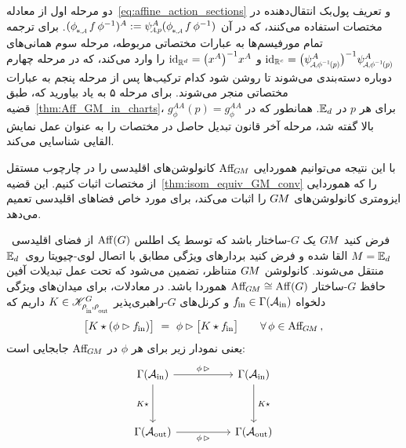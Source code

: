 دو مرحله اول از معادله~\eqref{eq:affine_action_sections} و تعریف پول‌بک انتقال‌دهنده در مختصات استفاده می‌کنند، که در آن $(\dphiA f\, \phi^{-1})^A := \psiAp^A(\dphiA f\, \phi^{-1})$.
برای ترجمه تمام مورفیسم‌ها به عبارات مختصاتی مربوطه، مرحله سوم همانی‌های $\id_{\R^c} = \big( \psiAphiinvp^A \big)^{-1} \psiAphiinvp^A$ و $\mathrm{id}_{\mathbb{R}^d} = \big( x^A \big)^{-1} x^A$ را وارد می‌کند، که در مرحله چهارم دوباره دسته‌بندی می‌شوند تا روشن شود کدام ترکیب‌ها پس از مرحله پنجم به عبارات مختصاتی منجر می‌شوند.
برای مرحله ۵ به یاد بیاورید که، طبق قضیه~\ref{thm:Aff_GM_in_charts}، $g_\phi^{AA}(p) = g_\phi^{AA}$ برای هر $p$ در $\mathbb{E}_d$.
همانطور که در بالا گفته شد، مرحله آخر قانون تبدیل حاصل در مختصات را به عنوان عمل نمایش القایی شناسایی می‌کند.

با این نتیجه می‌توانیم هموردایی $\operatorname{Aff}_{\mkern-2muG\mkern-1.4muM}$ کانولوشن‌های اقلیدسی را در چارچوب مستقل از مختصات اثبات کنیم.
این قضیه~\ref{thm:isom_equiv_GM_conv} را که هموردایی ایزومتری کانولوشن‌های $G\mkern-1.4muM$ را اثبات می‌کند، برای مورد خاص فضاهای اقلیدسی تعمیم می‌دهد.
\begin{thm}
	\label{thm:affine_equivariance_Euclidean_GM_conv}
	فرض کنید $G\mkern-1.4muM$ یک $G$-ساختار باشد که توسط یک اطلس $\operatorname{Aff}(G)$ از فضای اقلیدسی~${M = \mathbb{E}_d}$ القا شده و فرض کنید بردارهای ویژگی مطابق با اتصال لوی-چیویتا روی~$\mathbb{E}_d$ منتقل می‌شوند.
	کانولوشن $G\mkern-1.4muM$ متناظر، تضمین می‌شود که تحت عمل تبدیلات آفین حافظ $G$-ساختار $\operatorname{Aff}_{\mkern-2muG\mkern-1.4muM} \cong \operatorname{Aff}(G)$ هموردا باشد.
	در معادلات، برای میدان‌های ویژگی دلخواه $f_\textup{\;\!\!in} \in \Gamma(\mathcal{A}_\textup{in})$ و کرنل‌های $G$-راهبری‌پذیر $K\in\KG$ داریم که
	\begin{align}
		\big[K \star (\phi\rhd f_\textup{\;\!\!in}) \big]\ =\ \phi\rhd \big[K \star f_\textup{\;\!\!in} \big] \qquad \forall\, \phi\in\operatorname{Aff}_{\mkern-2muG\mkern-1.4muM} \,,
	\end{align}
	یعنی نمودار زیر برای هر $\phi$ در $\operatorname{Aff}_{\mkern-2muG\mkern-1.4muM}$ جابجایی است:
	\begin{equation}\label{cd:affine_equivariance_euclidean_gm_conv}
		\begin{tikzcd}[row sep=3.5em, column sep=5.em]
			\Gamma(\Ain)
			\arrow[r, pos=.5, "{\phi \,\rhd}"]
			\arrow[d, "{K\star\,}"']
			& \Gamma(\Ain)
			\arrow[d, "{\,K\star}"]
			\\
			\Gamma(\Aout)
			\arrow[r, pos=.5, "{\phi \,\rhd}"']
			& \Gamma(\Aout)
		\end{tikzcd}
	\end{equation}
\end{thm}


